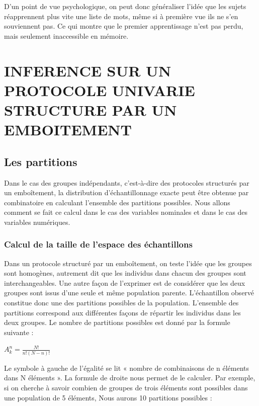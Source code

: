 \documentclass[]{book}
\theoremstyle{definition}
\theoremstyle{definition}
\theoremstyle{definition}
\theoremstyle{remark}
\begin{document}
D'un point de vue psychologique, on peut donc généraliser l'idée que les
sujets réapprennent plus vite une liste de mots, même si à première vue
ils ne s'en souviennent pas. Ce qui montre que le premier apprentissage
n'est pas perdu, mais seulement inaccessible en mémoire.

\hypertarget{inference-sur-un-protocole-univarie-structure-par-un-emboitement}{%
\chapter{INFERENCE SUR UN PROTOCOLE UNIVARIE STRUCTURE PAR UN
EMBOITEMENT}\label{inference-sur-un-protocole-univarie-structure-par-un-emboitement}}

\hypertarget{les-partitions}{%
\section{Les partitions}\label{les-partitions}}

Dans le cas des groupes indépendants, c'est-à-dire des protocoles
structurés par un emboîtement, la distribution d'échantillonnage exacte
peut être obtenue par combinatoire en calculant l'ensemble des
partitions possibles. Nous allons comment se fait ce calcul dans le cas
des variables nominales et dans le cas des variables numériques.

\hypertarget{calcul-de-la-taille-de-lespace-des-echantillons-2}{%
\subsection{Calcul de la taille de l'espace des
échantillons}\label{calcul-de-la-taille-de-lespace-des-echantillons-2}}

Dans un protocole structuré par un emboîtement, on teste l'idée que les
groupes sont homogènes, autrement dit que les individus dans chacun des
groupes sont interchangeables. Une autre façon de l'exprimer est de
considérer que les deux groupes sont issus d'une seule et même
population parente. L'échantillon observé constitue donc une des
partitions possibles de la population. L'ensemble des partitions
correspond aux différentes façons de répartir les individus dans les
deux groupes. Le nombre de partitions possibles est donné par la formule
suivante :

\(A_{k}^{n} =\frac{N!}{n!(N-n)!}\)

Le symbole à gauche de l'égalité se lit « nombre de combinaisons de n
éléments dans N éléments ». La formule de droite nous permet de le
calculer. Par exemple, si on cherche à savoir combien de groupes de
trois éléments sont possibles dans une population de 5 éléments, Nous
aurons 10 partitions possibles :
\end{document}
